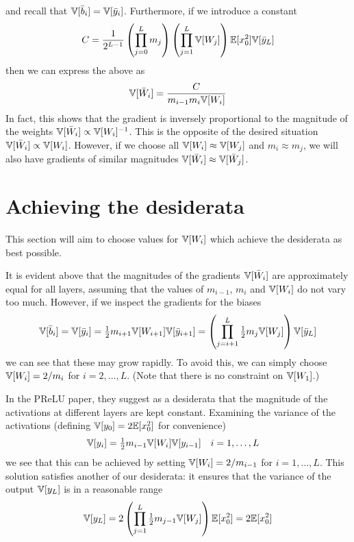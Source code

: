 and recall that $\mathbb{V}[\bar{b}_{i}] = \mathbb{V}[\bar{y}_{i}]$.
Furthermore, if we introduce a constant
\begin{equation}
C = \frac{1}{2^{L-1}} \left(\prod_{j=0}^{L} m_{j} \right) \left(\prod_{j=1}^{L} \mathbb{V}[W_{j}] \right)
  \mathbb{E}[x_{0}^2] \mathbb{V}[\bar{y}_{L}]
\end{equation}
then we can express the above as
\begin{equation}
\mathbb{V}[\bar{W}_{i}] = \frac{C}{m_{i-1} m_{i} \mathbb{V}[W_{i}]}
\end{equation}
In fact, this shows that the gradient is inversely proportional to the magnitude of the weights $\mathbb{V}[\bar{W}_{i}] \propto \mathbb{V}[W_{i}]^{-1}$.
This is the opposite of the desired situation $\mathbb{V}[\bar{W}_{i}] \propto \mathbb{V}[W_{i}]$.
However, if we choose all $\mathbb{V}[W_{i}] \approx \mathbb{V}[W_{j}]$ and $m_{i} \approx m_{j}$, we will also have gradients of similar magnitudes $\mathbb{V}[\bar{W}_{i}] \approx \mathbb{V}[\bar{W}_{j}]$.

\section{Achieving the desiderata}

This section will aim to choose values for $\mathbb{V}[W_{i}]$ which achieve the desiderata as best possible.

It is evident above that the magnitudes of the gradients $\mathbb{V}[\bar{W}_{i}]$ are approximately equal for all layers, assuming that the values of $m_{i-1}$, $m_{i}$ and $\mathbb{V}[W_{i}]$ do not vary too much.
However, if we inspect the gradients for the biases
\begin{equation}
\mathbb{V}[\bar{b}_{i}] = \mathbb{V}[\bar{y}_{i}] =\tfrac{1}{2} m_{i+1} \mathbb{V}[W_{i+1}] \mathbb{V}[\bar{y}_{i+1}] = \left( \prod_{j = i+1}^{L} \tfrac{1}{2} m_{j} \mathbb{V}[W_{j}] \right) \mathbb{V}[\bar{y}_{L}]
\end{equation}
we can see that these may grow rapidly.
To avoid this, we can simply choose $\mathbb{V}[W_{i}] = 2 / m_{i}$ for $i = 2, \dots, L$.
(Note that there is no constraint on $\mathbb{V}[W_{1}]$.)

In the PReLU paper, they suggest as a desiderata that the magnitude of the activations at different layers are kept constant.
Examining the variance of the activations (defining $\mathbb{V}[y_{0}] = 2 \mathbb{E}[x_{0}^2]$ for convenience)
\begin{align}
\mathbb{V}[y_{i}] & = \tfrac{1}{2} m_{i - 1} \mathbb{V}[W_{i}] \mathbb{V}[y_{i - 1}] && i = 1, \dots, L
\end{align}
we see that this can be achieved by setting $\mathbb{V}[W_{i}] = 2 / m_{i-1}$ for $i = 1, \dots, L$.
This solution satisfies another of our desiderata: it ensures that the variance of the output $\mathbb{V}[y_{L}]$ is in a reasonable range
\begin{equation}
\mathbb{V}[y_{L}] = 2 \left( \prod_{j = 1}^{L} \tfrac{1}{2} m_{j - 1} \mathbb{V}[W_{j}] \right) \mathbb{E}[x_{0}^2] = 2 \mathbb{E}[x_{0}^2]
\end{equation}


